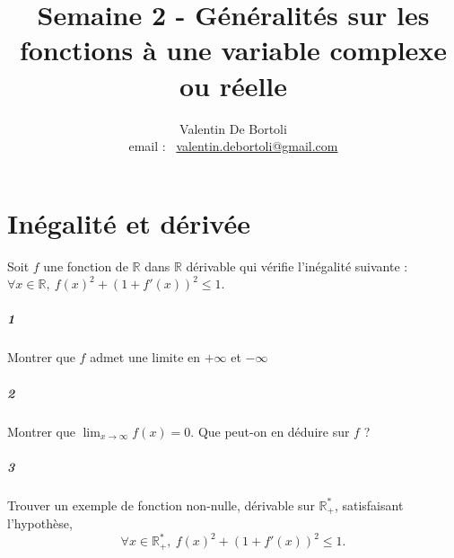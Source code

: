 \documentclass[10pt,a4paper]{article}
\title{Semaine 2 - Généralités sur les fonctions à une variable complexe ou réelle}
\author{Valentin De Bortoli \\ email : \ \href{mailto:valentin.debortoli@gmail.com}{valentin.debortoli@gmail.com}}
\date{}
\begin{document}
\maketitle

\section{Inégalité et dérivée}
Soit $f$ une fonction de $\mathbb{R}$ dans $\mathbb{R}$ dérivable qui vérifie l'inégalité suivante : $\forall x \in \mathbb{R}, \ f(x)^2+(1+f'(x))^2 \leq 1$.
\subparagraph{1}Montrer que $f$ admet une limite en $+\infty$ et $-\infty$
\subparagraph{2}Montrer que $\lim_{x \rightarrow \infty}f(x)=0.$ Que peut-on en déduire sur $f$ ?
\subparagraph{3}Trouver un exemple de fonction non-nulle, dérivable sur $\mathbb{R}_+^*$, satisfaisant l'hypothèse,
\begin{equation}
\forall x \in \mathbb{R}_{+}^*, \ f(x)^2+(1+f'(x))^2 \leq 1.
\end{equation}
\end{document}
